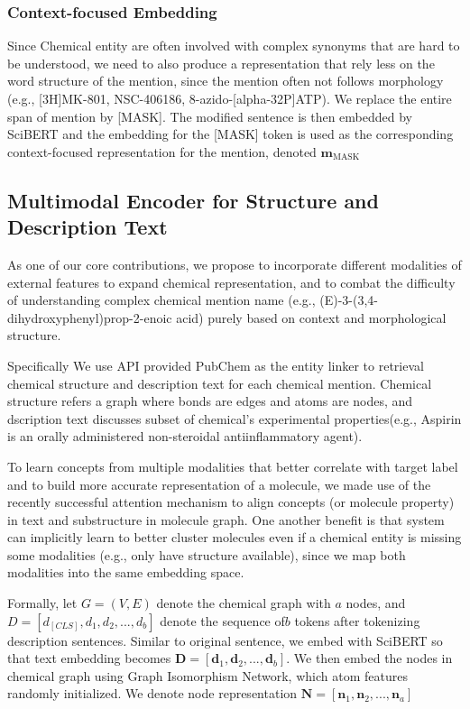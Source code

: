 
\subsubsection{Context-focused Embedding}
Since Chemical entity are often involved with complex synonyms that are hard to be understood, we need to also produce a representation that rely less on the word structure of the mention, since the mention often not follows morphology (e.g., [3H]MK-801, NSC-406186, 8-azido-[alpha-32P]ATP). We replace the entire span of mention by [MASK]. The modified sentence is then embedded by SciBERT and the embedding for the [MASK] token is used as the corresponding context-focused representation for the mention, denoted $\mathbf{m}_\text{MASK}$


\subsection{Multimodal Encoder for Structure and Description Text}
\label{sec:cmsa}


As one of our core contributions, we propose to incorporate different modalities of external features to expand chemical representation, and to combat the difficulty of understanding complex chemical mention name (e.g., (E)-3-(3,4-dihydroxyphenyl)prop-2-enoic acid) purely based on context and morphological structure. 

Specifically We use API provided PubChem as the entity linker to retrieval chemical structure and description text for each chemical mention. Chemical structure refers a graph where bonds are edges and atoms are nodes, and dscription text discusses subset of chemical's experimental properties(e.g., Aspirin is an orally administered non-steroidal antiinflammatory agent). 


To learn concepts from multiple modalities that better correlate with target label and to build more accurate representation of a molecule, we made use of the recently successful attention mechanism to align concepts (or molecule property) in text and substructure in molecule graph. One another benefit is that system can implicitly learn to better cluster molecules even if a chemical entity is missing some modalities (e.g., only have structure available), since we map both modalities into the same embedding space.


Formally, let $G=(V,E)$ denote the chemical graph with $a$ nodes, and $D=[d_{[CLS]}, d_1,d_2,...,d_b]$ denote the sequence of$b$  tokens after tokenizing description sentences. Similar to original sentence, we embed with SciBERT so that text embedding becomes $\mathbf{D}=[\mathbf{d}_1,\mathbf{d}_2,...,\mathbf{d}_b]$. We then embed the nodes in chemical graph using Graph Isomorphism Network\cite{gin}, which atom features randomly initialized. We denote node representation $\mathbf{N}=[\mathbf{n}_1,\mathbf{n}_2,...,\mathbf{n}_a]$

